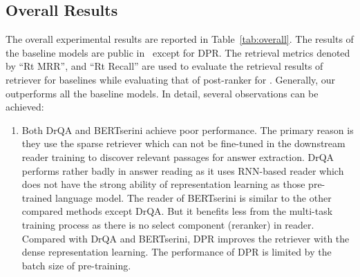 \vspace{-0.1in}
\subsection{Overall Results}
The overall experimental results are reported in Table~\ref{tab:overall}. The results of the baseline models are public in~\cite{qu2020open} except for DPR. The retrieval metrics denoted by ``Rt MRR'', and ``Rt Recall'' are used to evaluate the retrieval results of retriever for baselines while evaluating that of post-ranker for {\modelname}.
Generally, our {\modelname} outperforms all the baseline models. In detail, several observations can be achieved:
\begin{enumerate}
    \item Both DrQA and BERTserini achieve poor performance. The primary reason is they use the sparse retriever which can not be fine-tuned in the downstream  reader training to discover relevant passages for answer extraction. DrQA performs rather badly in answer reading as it uses RNN-based reader which does not have the strong ability of representation learning as those pre-trained language model. 
    The reader of BERTserini is similar to the other compared methods except DrQA. But it benefits less from the multi-task training process as there is no select component (reranker) in reader. 
    Compared with DrQA and BERTserini, DPR improves the retriever with the dense representation learning. The performance of DPR is limited by the batch size of pre-training.
    

\end{enumerate}
